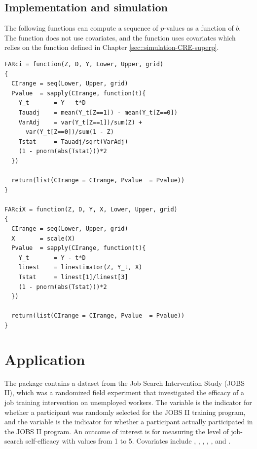 \subsection{Implementation and simulation}\label{sec::FARci-simulation}


The following functions can compute a sequence of $p$-values as a function of $b$. The function  does not use covariates, and the function  uses covariates which relies on the function  defined in Chapter \ref{sec::simulation-CRE-superp}. 

\begin{lstlisting}
FARci = function(Z, D, Y, Lower, Upper, grid)
{
  CIrange = seq(Lower, Upper, grid)
  Pvalue  = sapply(CIrange, function(t){
    Y_t       = Y - t*D
    Tauadj    = mean(Y_t[Z==1]) - mean(Y_t[Z==0])
    VarAdj    = var(Y_t[Z==1])/sum(Z) + 
      var(Y_t[Z==0])/sum(1 - Z)
    Tstat     = Tauadj/sqrt(VarAdj)
    (1 - pnorm(abs(Tstat)))*2
  })
  
  return(list(CIrange = CIrange, Pvalue  = Pvalue))
}

FARciX = function(Z, D, Y, X, Lower, Upper, grid)
{
  CIrange = seq(Lower, Upper, grid)
  X       = scale(X)
  Pvalue  = sapply(CIrange, function(t){
    Y_t       = Y - t*D
    linest    = linestimator(Z, Y_t, X)
    Tstat     = linest[1]/linest[3]
    (1 - pnorm(abs(Tstat)))*2
  })
  
  return(list(CIrange = CIrange, Pvalue  = Pvalue))
}
\end{lstlisting}



\section{Application}
\label{sec::cace-application}


The  package contains a dataset  from the Job Search Intervention Study (JOBS II), which was a randomized field experiment that investigated the efficacy of a job training intervention on unemployed workers. The variable  is the indicator for whether a participant was randomly selected for the JOBS II training program, and the variable  is the indicator for whether a participant actually participated in the JOBS II program. An outcome of interest is  for measuring the level of job-search self-efficacy with values from 1 to 5. Covariates include , , , , , and . 

